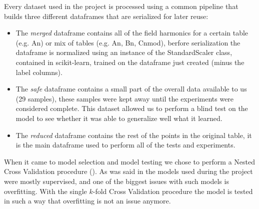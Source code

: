 Every dataset used in the project is processed using a common pipeline that builds three different
dataframes that are serialized for later reuse:
\begin{itemize}
	\item The \emph{merged} dataframe contains all of the field harmonics for a certain table
	      (e.g. An) or mix of tables (e.g. An, Bn, Cnmod), berfore serialization the dataframe is
	      normalized using an instance of the StandardScaler class, contained in scikit-learn, trained
	      on the dataframe just created (minus the label columns).
	\item The \emph{safe} dataframe contains a small part of the overall data available to us
	      (29 samples), these samples were kept away until the experiments were considered complete.
	      This dataset allowed us to perform a blind test on the model to see whether it was able to
	      generalize well what it learned.
	\item The \emph{reduced} dataframe contains the rest of the points in the original table,
	      it is the main dataframe used to perform all of the tests and experiments.
\end{itemize}

When it came to model selection and model testing we chose to perform a Nested Cross Validation
procedure (\ncv). As was said in  the models used during the project were mostly
supervised, and one of the biggest issues with such models is overfitting. With the single $k$-fold Cross
Validation procedure the model is tested in such a way that overfitting is not an issue anymore.
